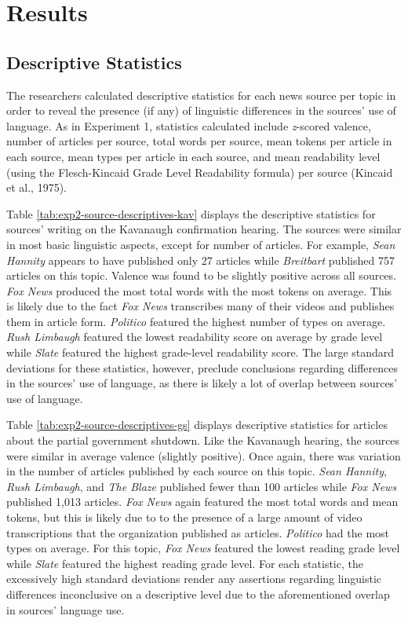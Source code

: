 \documentclass[english,,man]{apa6}
\begin{document}
\hypertarget{results-1}{%
\section{Results}\label{results-1}}

\hypertarget{descriptive-statistics-1}{%
\subsection{Descriptive Statistics}\label{descriptive-statistics-1}}

The researchers calculated descriptive statistics for each news source per topic in order to reveal the presence (if any) of linguistic differences in the sources' use of language. As in Experiment 1, statistics calculated include \emph{z}-scored valence, number of articles per source, total words per source, mean tokens per article in each source, mean types per article in each source, and mean readability level (using the Flesch-Kincaid Grade Level Readability formula) per source (Kincaid et al., 1975).

Table \ref{tab:exp2-source-descriptives-kav} displays the descriptive statistics for sources' writing on the Kavanaugh confirmation hearing. The sources were similar in most basic linguistic aspects, except for number of articles. For example, \emph{Sean Hannity} appears to have published only 27 articles while \emph{Breitbart} published 757 articles on this topic. Valence was found to be slightly positive across all sources. \emph{Fox News} produced the most total words with the most tokens on average. This is likely due to the fact \emph{Fox News} transcribes many of their videos and publishes them in article form. \emph{Politico} featured the highest number of types on average. \emph{Rush Limbaugh} featured the lowest readability score on average by grade level while \emph{Slate} featured the highest grade-level readability score. The large standard deviations for these statistics, however, preclude conclusions regarding differences in the sources' use of language, as there is likely a lot of overlap between sources' use of language.

Table \ref{tab:exp2-source-descriptives-gs} displays descriptive statistics for articles about the partial government shutdown. Like the Kavanaugh hearing, the sources were similar in average valence (slightly positive). Once again, there was variation in the number of articles published by each source on this topic. \emph{Sean Hannity}, \emph{Rush Limbaugh}, and \emph{The Blaze} published fewer than 100 articles while \emph{Fox News} published 1,013 articles. \emph{Fox News} again featured the most total words and mean tokens, but this is likely due to to the presence of a large amount of video transcriptions that the organization published as articles. \emph{Politico} had the most types on average. For this topic, \emph{Fox News} featured the lowest reading grade level while \emph{Slate} featured the highest reading grade level. For each statistic, the excessively high standard deviations render any assertions regarding linguistic differences inconclusive on a descriptive level due to the aforementioned overlap in sources' language use.
\end{document}
